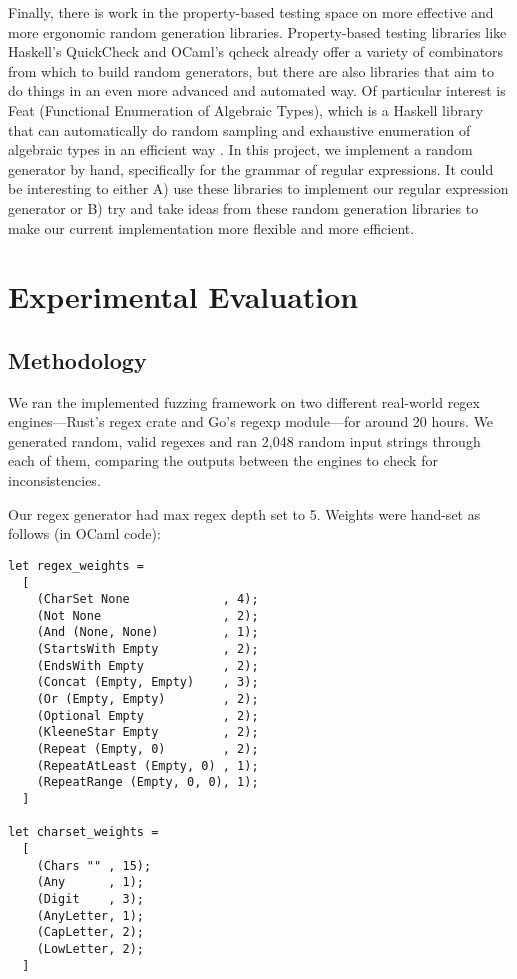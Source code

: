 \documentclass[acmsmall,nonacm,screen]{acmart}
\begin{document}
Finally, there is work in the property-based testing space on more effective and more ergonomic random generation libraries. Property-based testing libraries like Haskell's QuickCheck \cite{claessen2000quickcheck} and OCaml's qcheck already offer a variety of combinators from which to build random generators, but there are also libraries that aim to do things in an even more advanced and automated way. Of particular interest is Feat (Functional Enumeration of Algebraic Types), which is a Haskell library that can automatically do random sampling and exhaustive enumeration of algebraic types in an efficient way \cite{duregaard2012feat}. In this project, we implement a random generator by hand, specifically for the grammar of regular expressions. It could be interesting to either A) use these libraries to implement our regular expression generator or B) try and take ideas from these random generation libraries to make our current implementation more flexible and more efficient.

\section{Experimental Evaluation}
\subsection{Methodology}
We ran the implemented fuzzing framework on two different real-world regex engines---Rust's regex crate and Go's regexp module---for around 20 hours. We generated random, valid regexes and ran 2,048 random input strings through each of them, comparing the outputs between the engines to check for inconsistencies.

Our regex generator had max regex depth set to 5. Weights were hand-set as follows (in OCaml code):

\begin{verbatim}
let regex_weights =
  [
    (CharSet None             , 4);
    (Not None                 , 2);
    (And (None, None)         , 1);
    (StartsWith Empty         , 2);
    (EndsWith Empty           , 2);
    (Concat (Empty, Empty)    , 3);
    (Or (Empty, Empty)        , 2);
    (Optional Empty           , 2);
    (KleeneStar Empty         , 2);
    (Repeat (Empty, 0)        , 2);
    (RepeatAtLeast (Empty, 0) , 1);
    (RepeatRange (Empty, 0, 0), 1);
  ]

let charset_weights =
  [
    (Chars "" , 15);
    (Any      , 1);
    (Digit    , 3);
    (AnyLetter, 1);
    (CapLetter, 2);
    (LowLetter, 2);
  ]
\end{verbatim}
\end{document}
